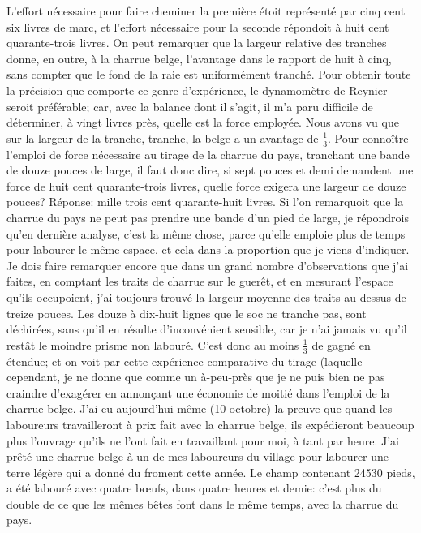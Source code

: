 L'effort nécessaire pour faire cheminer la première étoit représenté par cinq cent six livres de marc, et l'effort nécessaire pour la seconde répondoit à huit cent quarante-trois livres. On peut remarquer que la largeur relative des tranches donne, en outre, à la charrue belge, l'avantage dans le rapport de huit à cinq, sans compter que le fond de la raie est uniformément tranché.
Pour obtenir toute la précision que comporte ce genre d'expérience, le dynamomètre de Reynier seroit préférable; car, avec la balance dont il s'agit, il m'a paru difficile de déterminer, à vingt livres près, quelle est la force employée.
Nous avons vu que sur la largeur de la tranche,\setcounter{page}{403} tranche, la belge a un avantage de $\frac{1}{3}$. Pour connoître l'emploi de force nécessaire au tirage de la charrue du pays, tranchant une bande de douze pouces de large, il faut donc dire, si sept pouces et demi demandent une force de huit cent quarante-trois livres, quelle force exigera une largeur de douze pouces? Réponse: mille trois cent quarante-huit livres. Si l'on remarquoit que la charrue du pays ne peut pas prendre une bande d'un pied de large, je répondrois qu'en dernière analyse, c'est la même chose, parce qu'elle emploie plus de temps pour labourer le même espace, et cela dans la proportion que je viens d'indiquer.
Je dois faire remarquer encore que dans un grand nombre d'observations que j'ai faites, en comptant les traits de charrue sur le guerêt, et en mesurant l'espace qu'ils occupoient, j'ai toujours trouvé la largeur moyenne des traits au-dessus de treize pouces. Les douze à dix-huit lignes que le soc ne tranche pas, sont déchirées, sans qu'il en résulte d'inconvénient sensible, car je n'ai jamais vu qu'il restât le moindre prisme non labouré. C'est donc au moins $\frac{1}{3}$ de gagné en étendue; et on voit par cette expérience comparative du tirage (laquelle cependant,\setcounter{page}{404} je ne donne que comme un à-peu-près que je ne puis bien ne pas craindre d'exagérer en annonçant une économie de moitié dans l'emploi de la charrue belge.
J'ai eu aujourd'hui même (10 octobre) la preuve que quand les laboureurs travailleront à prix fait avec la charrue belge, ils expédieront beaucoup plus l'ouvrage qu'ils ne l'ont fait en travaillant pour moi, à tant par heure. J'ai prêté une charrue belge à un de mes laboureurs du village pour labourer une terre légère qui a donné du froment cette année. Le champ contenant 24530 pieds, a été labouré avec quatre bœufs, dans quatre heures et demie: c'est plus du double de ce que les mêmes bêtes font dans le même temps, avec la charrue du pays.
